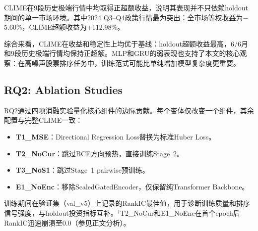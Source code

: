 CLIME在9段历史极端行情中均取得正超额收益，说明其表现并不只依赖holdout期间的单一市场环境。其中2024 Q3--Q4政策行情最为突出：全市场等权收益为$-$5.60\%，CLIME超额收益为+112.98\%。

综合来看，CLIME在收益和稳定性上均优于基线：holdout超额收益最高，6/6月和9段历史极端行情均保持正超额。MLP和GRU的弱表现也支持了本文的核心观察：在高噪声股票排序任务中，训练范式可能比单纯增加模型复杂度更重要。

\subsection{RQ2: Ablation Studies}
\label{sec:rq2}

RQ2通过四项消融实验量化核心组件的边际贡献。每个变体仅改变一个组件，其余配置与完整CLIME一致：

\begin{itemize}[leftmargin=*, itemsep=2pt]
    \item \textbf{T1\_MSE}：Directional Regression Loss替换为标准Huber Loss。
    \item \textbf{T2\_NoCur}：跳过BCE方向预热，直接训练Stage~2。
    \item \textbf{T3\_NoS1}：跳过Stage~1 pairwise预训练。
    \item \textbf{E1\_NoEnc}：移除ScaledGatedEncoder，仅保留纯Transformer Backbone。
\end{itemize}

\begin{table}[H]
\centering
\caption{RQ2：消融实验结果。$\Delta$Excess表示相对于完整CLIME的超额收益变化。Val RankIC$^*$为训练期间验证集上的最佳RankIC值。}
\label{tab:rq2_ablation}
\vspace{3pt}
{\footnotesize *训练期间在验证集（val\_v5）上记录的RankIC最佳值，用于诊断训练质量和排序信号强度，与holdout投资指标互补。$^\dagger$T2\_NoCur和E1\_NoEnc在首个epoch后RankIC迅速崩溃至0.0（参见正文分析）。}
\end{table}


